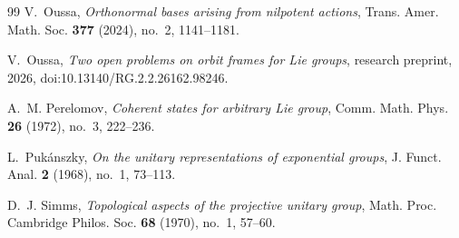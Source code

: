 \documentclass[reqno]{amsart}
\numberwithin{equation}{section}
\theoremstyle{definition}
\theoremstyle{remark}
\begin{document}
\begin{thebibliography}{99}
V.~Oussa,
\emph{Orthonormal bases arising from nilpotent actions},
Trans. Amer. Math. Soc. \textbf{377} (2024), no.~2, 1141--1181.

V.~Oussa,
\emph{Two open problems on orbit frames for Lie groups},
research preprint, 2026, doi:10.13140/RG.2.2.26162.98246.

A.~M. Perelomov,
\emph{Coherent states for arbitrary Lie group},
Comm. Math. Phys. \textbf{26} (1972), no.~3, 222--236.

L.~Puk\'anszky,
\emph{On the unitary representations of exponential groups},
J. Funct. Anal. \textbf{2} (1968), no.~1, 73--113.

D.~J. Simms,
\emph{Topological aspects of the projective unitary group},
Math. Proc. Cambridge Philos. Soc. \textbf{68} (1970), no.~1, 57--60.

\end{thebibliography}
\end{document}

